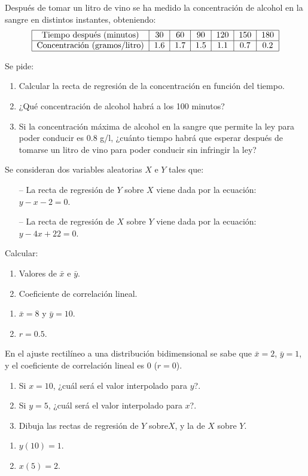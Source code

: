 {Después de tomar un litro de vino se ha medido la concentración de alcohol en la sangre en distintos instantes,
obteniendo:
\[
\begin{tabular}{|c|c|c|c|c|c|c|}
\hline
Tiempo después (minutos) & 30 & 60 & 90 & 120 & 150 & 180 \\ \hline
Concentración (gramos/litro) & 1.6 & 1.7 & 1.5 & 1.1 & 0.7 & 0.2 \\
\hline
\end{tabular}
\]

Se pide:
\begin{enumerate}
\item Calcular la recta de regresión de la concentración en función del tiempo.
\item ¿Qué concentración de alcohol habrá a los 100 minutos?
\item Si la concentración máxima de alcohol en la sangre que permite la ley para poder conducir es 0.8 g/l, ¿cuánto tiempo habrá que esperar después de tomarse un litro de vino para poder conducir sin infringir la ley?
\end{enumerate}
}
{}
{}


{Se consideran dos variables aleatorias $X$ e $Y$ tales que:
\begin{itemize}
\item[--] La recta de regresión de $Y$ sobre $X$ viene dada por la ecuación: $y-x-2=0$.
\item[--] La recta de regresión de $X$ sobre $Y$ viene dada por la ecuación: $y-4x+22=0$.
\end{itemize}
Calcular:
\begin{enumerate}
\item  Valores de $\bar x$ e $\bar y$.
\item  Coeficiente de correlación lineal.
\end{enumerate}
}
{
\begin{enumerate}
\item $\bar x=8$ y $\bar y=10$.
\item $r=0.5$.
\end{enumerate}
}
{}


{En el ajuste rectilíneo a una distribución bidimensional se sabe que $\bar x=2$, $\bar y=1$, y el coeficiente de correlación lineal es 0 ($r=0$).
\begin{enumerate}
\item  Si $x=10$, ¿cuál será el valor interpolado para $y$?.
\item  Si $y=5$, ¿cuál será el valor interpolado para $x$?.
\item  Dibuja las rectas de regresión de $Y$ sobre$X$, y la de $X$ sobre $Y$.
\end{enumerate}
}
{
\begin{enumerate}
\item $y(10)=1$.
\item $x(5)=2$.
\end{enumerate}
}
{}


